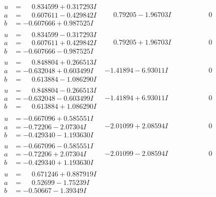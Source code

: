 \documentclass[1p]{elsarticle_modified}
\theoremstyle{definition}
\begin{document}
$$\begin{array}{c|c|c}
 \hline 
\begin{aligned}
u &= \phantom{-}0.834599 + 0.317293 I \\
a &= \phantom{-}0.607611 - 0.429842 I \\
b &= -0.607666 + 0.987525 I\end{aligned}
 & \phantom{-}0.79205 - 1.96703 I & \phantom{-0.000000 } 0 \\ \hline\begin{aligned}
u &= \phantom{-}0.834599 - 0.317293 I \\
a &= \phantom{-}0.607611 + 0.429842 I \\
b &= -0.607666 - 0.987525 I\end{aligned}
 & \phantom{-}0.79205 + 1.96703 I & \phantom{-0.000000 } 0 \\ \hline\begin{aligned}
u &= \phantom{-}0.848804 + 0.266513 I \\
a &= -0.632048 + 0.603499 I \\
b &= \phantom{-}0.613884 - 1.086290 I\end{aligned}
 & -1.41894 - 6.93011 I & \phantom{-0.000000 } 0 \\ \hline\begin{aligned}
u &= \phantom{-}0.848804 - 0.266513 I \\
a &= -0.632048 - 0.603499 I \\
b &= \phantom{-}0.613884 + 1.086290 I\end{aligned}
 & -1.41894 + 6.93011 I & \phantom{-0.000000 } 0 \\ \hline\begin{aligned}
u &= -0.667096 + 0.585551 I \\
a &= -0.72206 - 2.07304 I \\
b &= -0.429340 - 1.193630 I\end{aligned}
 & -2.01099 + 2.08594 I & \phantom{-0.000000 } 0 \\ \hline\begin{aligned}
u &= -0.667096 - 0.585551 I \\
a &= -0.72206 + 2.07304 I \\
b &= -0.429340 + 1.193630 I\end{aligned}
 & -2.01099 - 2.08594 I & \phantom{-0.000000 } 0 \\ \hline\begin{aligned}
u &= \phantom{-}0.671246 + 0.887919 I \\
a &= \phantom{-}0.52699 - 1.75239 I \\
b &= -0.50667 - 1.39349 I\end{aligned}

\end{array}$$
\end{document}
